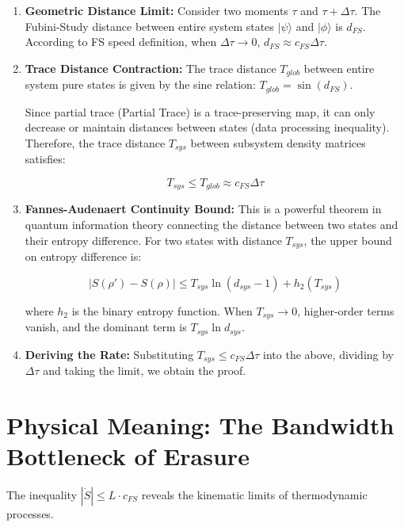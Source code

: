 \documentclass[11pt,a4paper,twoside]{book}
\begin{document}
\begin{enumerate}
\item \textbf{Geometric Distance Limit:} Consider two moments \textbf{$\tau$} and \textbf{$\tau + \Delta \tau$}. The Fubini-Study distance between entire system states \textbf{$|\psi\rangle$} and \textbf{$|\phi\rangle$} is \textbf{$d_{FS}$}. According to FS speed definition, when \textbf{$\Delta \tau \to 0$}, \textbf{$d_{FS} \approx c_{FS} \Delta \tau$}.

\item \textbf{Trace Distance Contraction:} The trace distance \textbf{$T_{glob}$} between entire system pure states is given by the sine relation: \textbf{$T_{glob} = \sin(d_{FS})$}.

   Since partial trace (Partial Trace) is a trace-preserving map, it can only decrease or maintain distances between states (data processing inequality). Therefore, the trace distance \textbf{$T_{sys}$} between subsystem density matrices satisfies:

   $$T_{sys} \le T_{glob} \approx c_{FS} \Delta \tau$$

\item \textbf{Fannes-Audenaert Continuity Bound:} This is a powerful theorem in quantum information theory connecting the distance between two states and their entropy difference. For two states with distance \textbf{$T_{sys}$}, the upper bound on entropy difference is:

   $$|S(\rho') - S(\rho)| \le T_{sys} \ln(d_{sys}-1) + h_2(T_{sys})$$

   where \textbf{$h_2$} is the binary entropy function. When \textbf{$T_{sys} \to 0$}, higher-order terms vanish, and the dominant term is \textbf{$T_{sys} \ln d_{sys}$}.

\item \textbf{Deriving the Rate:} Substituting \textbf{$T_{sys} \le c_{FS} \Delta \tau$} into the above, dividing by \textbf{$\Delta \tau$} and taking the limit, we obtain the proof.
\end{enumerate}

\section{Physical Meaning: The Bandwidth Bottleneck of Erasure}

The inequality \textbf{$|\dot{S}| \le L \cdot c_{FS}$} reveals the kinematic limits of thermodynamic processes.
\end{document}
